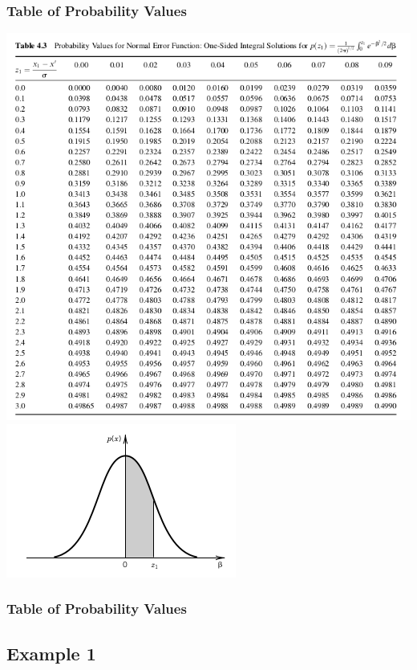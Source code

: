 \documentclass[fleqn]{beamer} %
\newcommand{\sectionIIIsubsectionItitle}{Table of Probability Values}
\newcommand{\sectionIIIsubsectionIItitle}{Example 1}
\begin{document}
			\begin{frame}
				\frametitle{\sectionIIIsubsectionItitle}

				\includegraphics[scale=.3]{images/topic2_fig2.png}	
				\includegraphics[scale=.3]{images/topic2_fig3.png}	
				
			\end{frame}

			\begin{frame}
				\frametitle{\sectionIIIsubsectionItitle}


		
			\end{frame}

		\subsection{\sectionIIIsubsectionIItitle}\label{sectionIIIsubsectionII}	
\end{document}
